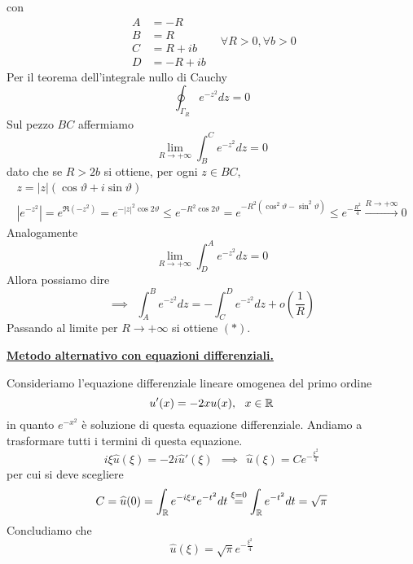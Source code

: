 con
\begin{equation*}
\begin{aligned}
A & = - R\\
B & = R\\
C & = R + ib\\
D & = - R + ib
\end{aligned} \ \ \ \ \forall R > 0,\forall b > 0
\end{equation*}
Per il teorema dell'integrale nullo di Cauchy
\begin{equation*}
\oint _{\Gamma _{R}} e^{ - z^{2}} dz = 0
\end{equation*}
Sul pezzo $BC$ affermiamo
\begin{equation*}
\lim\limits _{R\rightarrow + \infty }\int ^{C}_{B} e^{ - z^{2}} dz = 0
\end{equation*}
dato che se $R > 2b$ si ottiene, per ogni $z\in BC$,
\begin{gather*}
z = | z| (\cos \vartheta + i\sin \vartheta)\\
\left| e^{ - z^{2}}\right| = e^{\Re \left(- z^{2}\right)} = e^{ - | z| ^{2}\cos 2\vartheta } \leq e^{ - R^{2}\cos 2\vartheta } = e^{ - R^{2}\left(\cos^{2} \vartheta - \sin^{2} \vartheta \right)} \leq e^{ - \frac{R^{2}}{4}}\xrightarrow{R\rightarrow + \infty } 0
\end{gather*}
Analogamente
\begin{equation*}
\lim\limits _{R\rightarrow + \infty }\int ^{A}_{D} e^{ - z^{2}} dz = 0
\end{equation*}
Allora possiamo dire
\begin{equation*}
\implies \ \ \int ^{B}_{A} e^{ - z^{2}} dz = -\int ^{D}_{C} e^{ - z^{2}} dz + o\left(\frac{1}{R}\right)
\end{equation*}
Passando al limite per $R\rightarrow + \infty $ si ottiene $(*)$.



\underline{\textbf{Metodo alternativo con equazioni differenziali.}}

Consideriamo l'equazione differenziale lineare omogenea del primo ordine
\begin{equation*}
u'(x) = - 2xu(x) ,\ \ x\in \mathbb{R} 
\end{equation*}
in quanto $e^{ - x^{2}}$ è soluzione di questa equazione differenziale. Andiamo a trasformare tutti i termini di questa equazione.
\begin{equation*}
i\xi \hat{u}(\xi) = - 2i\hat{u} '(\xi) \ \ \implies \ \ \hat{u}(\xi) = Ce^{ - \frac{\xi ^{2}}{4}}
\end{equation*}
per cui si deve scegliere
\begin{equation*}
C = \widehat{u}(0) = \int _{\mathbb{R} } e^{ - i\xi x} e^{ - t^{2}} dt\overset{\xi = 0}{ = }\int _{\mathbb{R} } e^{ - t^{2}} dt = \sqrt{\pi }
\end{equation*}
Concludiamo che
\begin{equation*}
\boxed{\hat{u}(\xi) = \sqrt{\pi } e^{ - \frac{\xi ^{2}}{4}}}
\end{equation*}
\Soluzione

